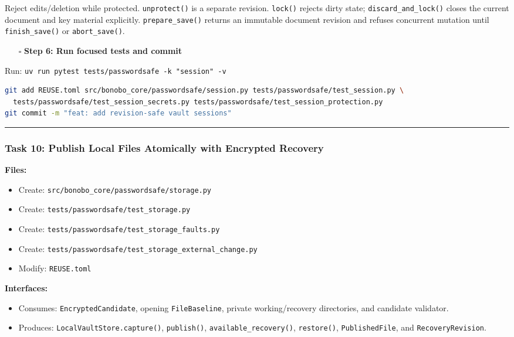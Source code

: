 \documentclass[
  letterpaper,
]{article}
\newcommand{\passthrough}[1]{#1}
\providecommand{\tightlist}{%
  \setlength{\itemsep}{0pt}\setlength{\parskip}{0pt}}
\begin{document}
Reject edits/deletion while protected. \nolinkurl{unprotect()} is a separate revision. \passthrough{\lstinline!lock()!}
rejects dirty state; \nolinkurl{discard_and_lock()} closes the current document and key material explicitly.
\nolinkurl{prepare_save()} returns an immutable document revision and refuses concurrent mutation until
\nolinkurl{finish_save()} or \nolinkurl{abort_save()}.

\begin{itemize}
\tightlist
\item[$\square$]
  \textbf{Step 6: Run focused tests and commit}
\end{itemize}

Run: \passthrough{\lstinline!uv run pytest tests/passwordsafe -k "session" -v!}

\begin{lstlisting}[language=bash]
git add REUSE.toml src/bonobo_core/passwordsafe/session.py tests/passwordsafe/test_session.py \
  tests/passwordsafe/test_session_secrets.py tests/passwordsafe/test_session_protection.py
git commit -m "feat: add revision-safe vault sessions"
\end{lstlisting}

\begin{center}\rule{0.5\linewidth}{0.5pt}\end{center}

\subsubsection{Task 10: Publish Local Files Atomically with Encrypted
Recovery}\label{task-10-publish-local-files-atomically-with-encrypted-recovery}

\textbf{Files:}

\begin{itemize}
\tightlist
\item
  Create: \nolinkurl{src/bonobo_core/passwordsafe/storage.py}
\item
  Create: \nolinkurl{tests/passwordsafe/test_storage.py}
\item
  Create: \nolinkurl{tests/passwordsafe/test_storage_faults.py}
\item
  Create: \nolinkurl{tests/passwordsafe/test_storage_external_change.py}
\item
  Modify: \nolinkurl{REUSE.toml}
\end{itemize}

\textbf{Interfaces:}

\begin{itemize}
\tightlist
\item
  Consumes: \nolinkurl{EncryptedCandidate}, opening \nolinkurl{FileBaseline}, private working/recovery directories, and
  candidate validator.
\item
  Produces: \nolinkurl{LocalVaultStore.capture()}, \passthrough{\lstinline!publish()!},
  \nolinkurl{available_recovery()}, \passthrough{\lstinline!restore()!}, \nolinkurl{PublishedFile}, and
  \nolinkurl{RecoveryRevision}.
\end{itemize}
\end{document}
